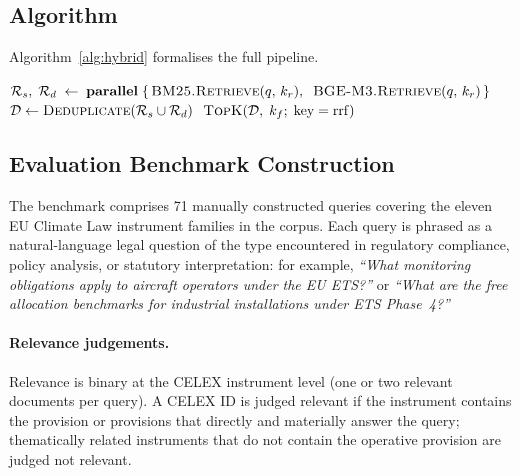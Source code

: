 \documentclass{iosart2x}
\begin{document}
\subsection{Algorithm}
\label{sec:algo}

Algorithm~\ref{alg:hybrid} formalises the full pipeline.

\begin{algorithm}[t]
\DontPrintSemicolon
\caption{Hybrid Sparse-Dense Retrieval Pipeline}
\label{alg:hybrid}
\BlankLine
{}
$\mathcal{R}_s,\;\mathcal{R}_d \;\leftarrow\;
  \textbf{parallel}\;\{\,
    \textsc{BM25.Retrieve}(q,\,k_r),\;\;
    \textsc{BGE\text{-}M3.Retrieve}(q,\,k_r)
  \,\}$\;
\BlankLine
{}
$\mathcal{D} \leftarrow \textsc{Deduplicate}(\mathcal{R}_s \cup \mathcal{R}_d)$
\BlankLine
{}
\Return $\;\textsc{TopK}\!\left(\mathcal{D},\;k_f;\;\text{key}=\mathrm{rrf}\right)$\;
\end{algorithm}

\subsection{Evaluation Benchmark Construction}
\label{sec:eval-bench}

The benchmark comprises 71 manually constructed queries covering the
eleven EU Climate Law instrument families in the corpus.  Each query
is phrased as a natural-language legal question of the type encountered
in regulatory compliance, policy analysis, or statutory interpretation:
for example, \textit{``What monitoring obligations apply to aircraft
operators under the EU ETS?''} or \textit{``What are the free
allocation benchmarks for industrial installations under ETS Phase~4?''}

\paragraph{Relevance judgements.}  Relevance is binary at the CELEX
instrument level (one or two relevant documents per query).  A CELEX
ID is judged relevant if the instrument contains the provision or
provisions that directly and materially answer the query; thematically
related instruments that do not contain the operative provision are
judged not relevant.
\end{document}
